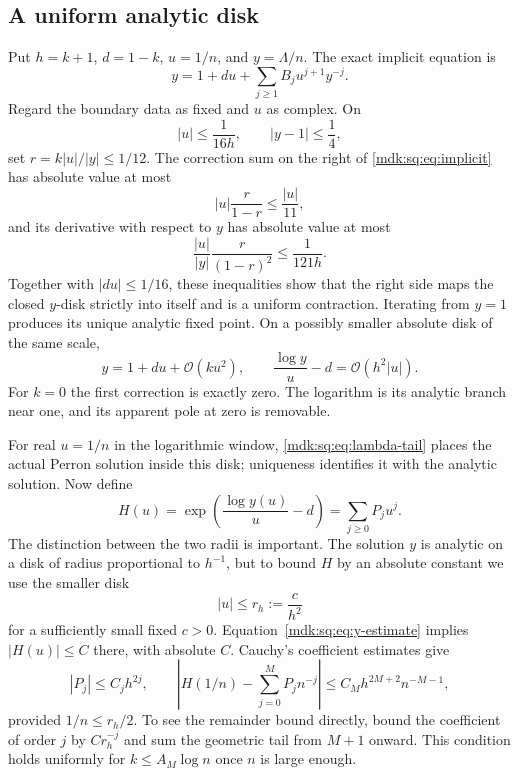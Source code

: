 \documentclass[11pt,letterpaper]{article}
\numberwithin{equation}{section}
\theoremstyle{remark}\newtheorem{remark}[theorem]{Remark}
\newcommand{\Oh}{\mathcal O}\newcommand{\Q}{\mathbb Q}\newcommand{\N}{\mathbb N}\newcommand{\R}{\mathbb R}
\begin{document}
\subsection{A uniform analytic disk}
Put $h=k+1$, $d=1-k$, $u=1/n$, and $y=\Lambda/n$. The exact implicit equation is
\begin{equation}\label{mdk:sq:eq:implicit}
y=1+du+\sum_{j\ge1}B_j u^{j+1}y^{-j}.
\end{equation}
Regard the boundary data as fixed and $u$ as complex. On
\[
|u|\le\frac1{16h},\qquad |y-1|\le\frac14,
\]
set $r=k|u|/|y|\le1/12$. The correction sum on the right of \eqref{mdk:sq:eq:implicit} has absolute value at most
\[
|u|\frac r{1-r}\le\frac{|u|}{11},
\]
and its derivative with respect to $y$ has absolute value at most
\[
\frac{|u|}{|y|}\frac r{(1-r)^2}\le\frac1{121h}.
\]
Together with $|du|\le1/16$, these inequalities show that the right side maps the closed $y$-disk strictly into itself and is a uniform contraction. Iterating from $y=1$ produces its unique analytic fixed point. On a possibly smaller absolute disk of the same scale,
\begin{equation}\label{mdk:sq:eq:y-estimate}
y=1+du+\Oh(k u^2),\qquad
\frac{\log y}{u}-d=\Oh(h^2|u|).
\end{equation}
For $k=0$ the first correction is exactly zero. The logarithm is its analytic branch near one, and its apparent pole at zero is removable.

For real $u=1/n$ in the logarithmic window, \eqref{mdk:sq:eq:lambda-tail} places the actual Perron solution inside this disk; uniqueness identifies it with the analytic solution. Now define
\begin{equation}\label{mdk:sq:eq:H}
H(u)=\exp\left(\frac{\log y(u)}u-d\right)=\sum_{j\ge0}P_ju^j.
\end{equation}
The distinction between the two radii is important. The solution $y$ is analytic on a disk of radius proportional to $h^{-1}$, but to bound $H$ by an absolute constant we use the smaller disk
\begin{equation}\label{mdk:sq:eq:small-radius}
|u|\le r_h:=\frac c{h^2}
\end{equation}
for a sufficiently small fixed $c>0$. Equation~\eqref{mdk:sq:eq:y-estimate} implies $|H(u)|\le C$ there, with absolute $C$. Cauchy's coefficient estimates give
\begin{equation}\label{mdk:sq:eq:cauchy}
|P_j|\le C_jh^{2j},\qquad
\left|H(1/n)-\sum_{j=0}^MP_jn^{-j}\right|
\le C_Mh^{2M+2}n^{-M-1},
\end{equation}
provided $1/n\le r_h/2$. To see the remainder bound directly, bound the coefficient of order $j$ by $Cr_h^{-j}$ and sum the geometric tail from $M+1$ onward. This condition holds uniformly for $k\le A_M\log n$ once $n$ is large enough.
\end{document}
